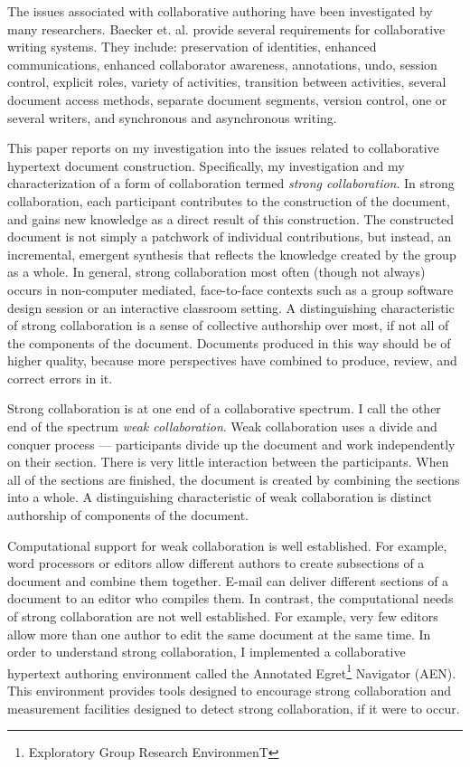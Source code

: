 The issues associated with collaborative authoring have been investigated
by many researchers.  Baecker et. al. \cite{Baecker93} provide several
requirements for collaborative writing systems.  They include: preservation
of identities, enhanced communications, enhanced collaborator awareness,
annotations, undo, session control, explicit roles, variety of activities,
transition between activities, several document access methods, separate
document segments, version control, one or several writers, and synchronous
and asynchronous writing.

This paper reports on my investigation into the issues related to
collaborative hypertext document construction.  Specifically, my
investigation and my characterization of a form of collaboration termed
{\em strong collaboration}.  In strong collaboration, each participant
contributes to the construction of the document, and gains new knowledge as
a direct result of this construction.  The constructed document is not
simply a patchwork of individual contributions, but instead, an
incremental, emergent synthesis that reflects the knowledge created by the
group as a whole.  In general, strong collaboration most often (though not
always) occurs in non-computer mediated, face-to-face contexts such as a
group software design session or an interactive classroom setting.  A
distinguishing characteristic of strong collaboration is a sense of
collective authorship over most, if not all of the components of the
document.  Documents produced in this way should be of higher quality,
because more perspectives have combined to produce, review, and correct
errors in it.

Strong collaboration is at one end of a collaborative spectrum.  I call
the other end of the spectrum {\em weak collaboration}.  Weak collaboration
uses a divide and conquer process --- participants divide up the document
and work independently on their section.  There is very little interaction
between the participants.  When all of the sections are finished, the
document is created by combining the sections into a whole.  A
distinguishing characteristic of weak collaboration is distinct authorship
of components of the document.  

Computational support for weak collaboration is well established.  For
example, word processors or editors allow different authors to create
subsections of a document and combine them together.  E-mail can deliver
different sections of a document to an editor who compiles them.  In
contrast, the computational needs of strong collaboration are not well
established.  For example, very few editors allow more than one author to
edit the same document at the same time.  In order to understand strong
collaboration, I implemented a collaborative hypertext authoring
environment called the Annotated Egret\footnote{Exploratory Group Research
EnvironmenT} Navigator (AEN).  This environment provides tools designed to
encourage strong collaboration and measurement facilities designed to
detect strong collaboration, if it were to occur.

